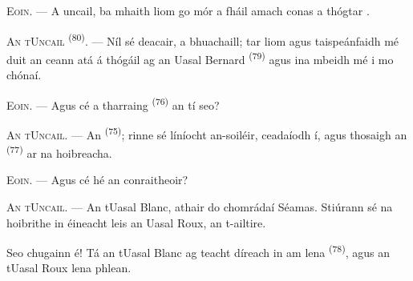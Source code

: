 %
%
%

\VUsaut{6.0mm}
\VUsaut{1.4mm}
\VUsaut{2.2mm}

\VUsaut{3.0mm}

\textsc{Eoin}. --- A uncail, ba mhaith liom go mór a fháil amach conas a thógtar
.

\textsc{An tUncail} \textsuperscript{(80)}. --- Níl sé deacair, a bhuachaill; tar
liom agus taispeánfaidh mé duit an ceann atá á thógáil ag an Uasal Bernard
\textsuperscript{(79)} agus ina mbeidh mé i mo chónaí.

\textsc{Eoin}. --- Agus cé a tharraing  \textsuperscript{(76)} an tí
seo?

\textsc{An tUncail}. --- An  \textsuperscript{(75)}; rinne sé
líníocht an-soiléir, ceadaíodh í, agus thosaigh an 
\textsuperscript{(77)} ar na hoibreacha.

\textsc{Eoin}. --- Agus cé hé an conraitheoir?

\textsc{An tUncail}. --- An tUasal Blanc, athair do chomrádaí Séamas. Stiúrann sé
na hoibrithe in éineacht leis an Uasal Roux, an t-ailtire.

Seo chugainn é! Tá an tUasal Blanc ag teacht díreach in am lena 
\textsuperscript{(78)}, agus an tUasal Roux lena phlean.

